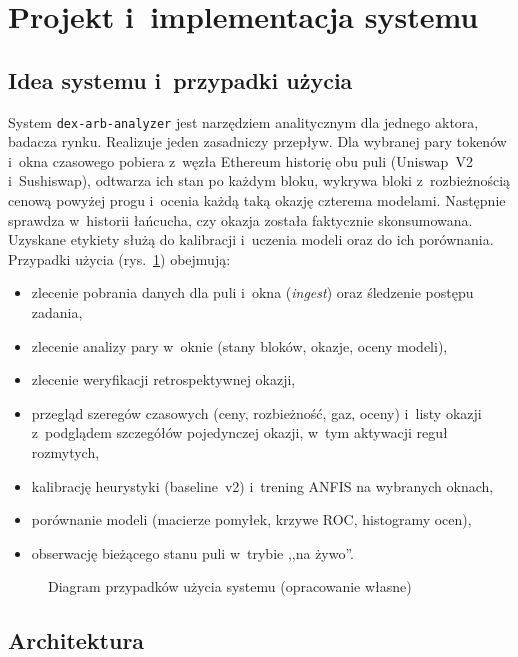 \newpage
\section{Projekt i~implementacja systemu}

\subsection{Idea systemu i~przypadki użycia}

System \texttt{dex-arb-analyzer} jest narzędziem analitycznym dla jednego aktora, badacza rynku.
Realizuje jeden zasadniczy przepływ. Dla wybranej pary tokenów i~okna czasowego pobiera z~węzła
Ethereum historię obu puli (Uniswap~V2 i~Sushiswap), odtwarza ich stan po każdym bloku, wykrywa
bloki z~rozbieżnością cenową powyżej progu i~ocenia każdą taką okazję czterema modelami.
Następnie sprawdza w~historii łańcucha, czy okazja została faktycznie skonsumowana. Uzyskane
etykiety służą do kalibracji i~uczenia modeli oraz do ich porównania. Przypadki użycia
(rys.~\ref{fig:uc}) obejmują:
\begin{itemize}[nosep]
  \item zlecenie pobrania danych dla puli i~okna (\emph{ingest}) oraz śledzenie postępu zadania,
  \item zlecenie analizy pary w~oknie (stany bloków, okazje, oceny modeli),
  \item zlecenie weryfikacji retrospektywnej okazji,
  \item przegląd szeregów czasowych (ceny, rozbieżność, gaz, oceny) i~listy okazji z~podglądem
        szczegółów pojedynczej okazji, w~tym aktywacji reguł rozmytych,
  \item kalibrację heurystyki (baseline~v2) i~trening ANFIS na wybranych oknach,
  \item porównanie modeli (macierze pomyłek, krzywe ROC, histogramy ocen),
  \item obserwację bieżącego stanu puli w~trybie ,,na żywo''.
\end{itemize}
\begin{figure}[H]\centering
\caption{Diagram przypadków użycia systemu (opracowanie własne)}\label{fig:uc}\end{figure}

\subsection{Architektura}

